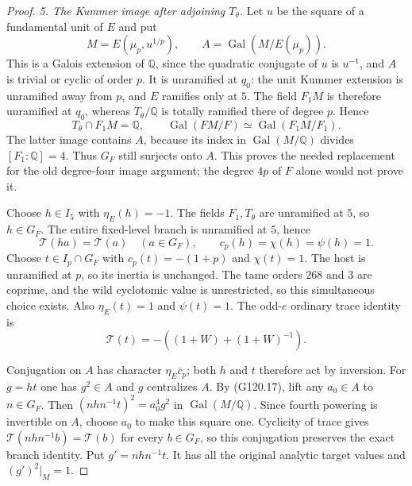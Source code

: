 \begin{proof}
\emph{5. The Kummer image after adjoining $T_\theta$.}
Let $u$ be the square of a fundamental unit of $E$ and put
\[
                   M=E(\mu_p,u^{1/p}),\qquad
                   A=\operatorname{Gal}(M/E(\mu_p)).
                                                                    \tag{G120.16}
\]
This is a Galois extension of $\mathbb Q$, since the quadratic
conjugate of $u$ is $u^{-1}$, and $A$ is trivial or cyclic of
order $p$.  It is unramified at $q_0$: the unit Kummer extension
is unramified away from $p$, and $E$ ramifies only at $5$.
The field $F_1M$ is therefore unramified at $q_0$, whereas
$T_\theta/\mathbb Q$ is totally ramified there of degree $p$.
Hence
\[
               T_\theta\cap F_1M=\mathbb Q,
 \qquad \operatorname{Gal}(FM/F)
                  \simeq\operatorname{Gal}(F_1M/F_1).             \tag{G120.17}
\]
The latter image contains $A$, because its index in
$\operatorname{Gal}(M/\mathbb Q)$ divides $[F_1:\mathbb Q]=4$.
Thus $G_F$ still surjects onto $A$.  This proves the needed
replacement for the old degree-four image argument; the
degree $4p$ of $F$ alone would not prove it.

Choose $h\in I_5$ with $\eta_E(h)=-1$.
The fields $F_1,T_\theta$ are unramified at $5$, so $h\in G_F$.
The entire fixed-level branch is unramified at $5$, hence
\[
 \mathcal T(ha)=\mathcal T(a)\quad(a\in G_F),\qquad
                  c_p(h)=\chi(h)=\psi(h)=1.                       \tag{G120.18}
\]
Choose $t\in I_p\cap G_F$ with $c_p(t)=-(1+p)$ and $\chi(t)=1$.
The host is unramified at $p$, so its inertia is unchanged.
The tame orders $268$ and $3$ are coprime, and the wild
cyclotomic value is unrestricted, so this simultaneous choice
exists.  Also $\eta_E(t)=1$ and $\psi(t)=1$.
The odd-$e$ ordinary trace identity is
\[
              \mathcal T(t)=-((1+W)+(1+W)^{-1}).                  \tag{G120.19}
\]

Conjugation on $A$ has character $\eta_E\bar c_p$;
both $h$ and $t$ therefore act by inversion.
For $g=ht$ one has $g^2\in A$ and $g$ centralizes $A$.
By (G120.17), lift any $a_0\in A$ to $n\in G_F$.
Then $(nhn^{-1}t)^2=a_0^4g^2$ in $\operatorname{Gal}(M/\mathbb Q)$.
Since fourth powering is invertible on $A$, choose $a_0$ to
make this square one.  Cyclicity of trace gives
$\mathcal T(nhn^{-1}b)=\mathcal T(b)$ for every $b\in G_F$,
so this conjugation preserves the exact branch identity.
Put $g'=nhn^{-1}t$.  It has all the original analytic target
values and $(g')^2|_M=1$.


\end{proof}
